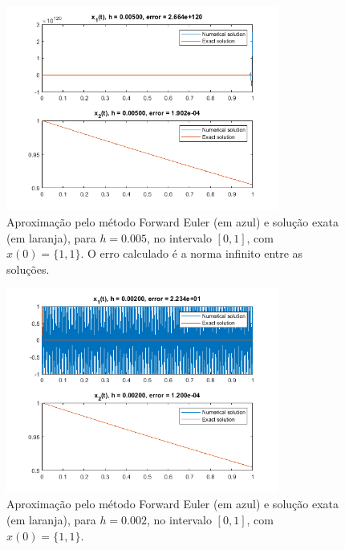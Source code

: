 \documentclass{article}
\begin{document}
\begin{enumerate}
\begin{enumerate}
                    \begin{figure}[!h]
                        \centering
                        \includegraphics[width=0.8\textwidth]{images/forward_1.png}
                        \caption{Aproximação pelo método Forward Euler (em azul) e
                        solução exata (em laranja), para $h = 0.005$,
                        no intervalo $[0, 1]$, com $x(0) = \{1, 1\}$.
                        O erro calculado é a norma infinito entre as
                        soluções.}
                        \label{fig:forward_1}
                    \end{figure}
                    
                    \begin{figure}[!h]
                        \centering
                        \includegraphics[width=0.8\textwidth]{images/forward_2.png}
                        \caption{Aproximação pelo método Forward Euler (em azul) e
                        solução exata (em laranja), para $h = 0.002$,
                        no intervalo $[0, 1]$, com $x(0) = \{1, 1\}$.}
                        \label{fig:forward_2}
                    \end{figure}
                    

\end{enumerate}
\end{enumerate}
\end{document}
